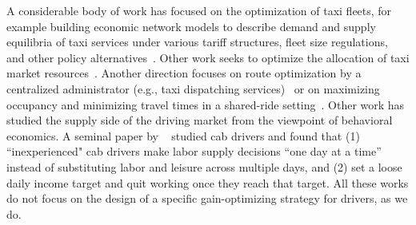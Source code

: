 A considerable body of work has focused on the optimization of taxi fleets, for
example building economic network models to describe demand and supply equilibria of taxi 
services under various tariff structures, fleet size regulations, and other policy
alternatives~\cite{bailey1987simulation,yang2002demand}.  Other work seeks to 
 optimize the allocation of taxi market resources~\cite{shi2016optimization}.
Another direction focuses on route optimization by a centralized administrator (e.g., taxi dispatching services)~\cite{maciejewski2013simulation,nunes2011taxi} 
or on maximizing occupancy and minimizing travel times 
in a shared-ride setting~\cite{jung2013design}.
Other work has studied the supply side of the driving market from the viewpoint of behavioral economics.
A seminal paper by ~\cite{camerer1997labor} studied cab drivers and found that  (1) ``inexperienced" 
cab drivers make labor supply decisions ``one day at a time'' instead of substituting labor and leisure across multiple days, and  (2) set a loose daily income target and quit working once they reach that target.  
All these works do not focus on the design of a specific gain-optimizing
strategy for drivers, as we do.

